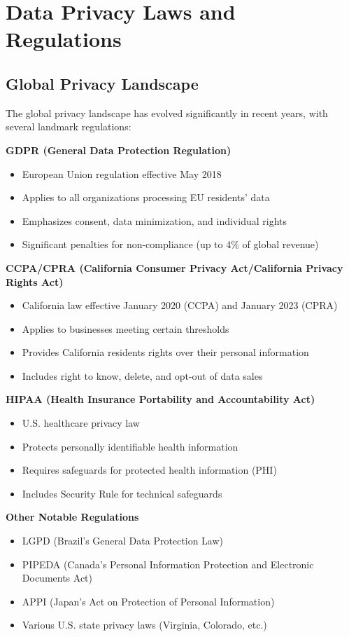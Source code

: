 \documentclass[12pt]{article}
\begin{document}
\section{Data Privacy Laws and Regulations}

\subsection{Global Privacy Landscape}
\begin{tcolorbox}[colback=gray!10!white,colframe=gray!50!black,title={Major Privacy Regulations}]
The global privacy landscape has evolved significantly in recent years, with several landmark regulations:

\textbf{GDPR (General Data Protection Regulation)}
\begin{itemize}
    \item European Union regulation effective May 2018
    \item Applies to all organizations processing EU residents' data
    \item Emphasizes consent, data minimization, and individual rights
    \item Significant penalties for non-compliance (up to 4\% of global revenue)
\end{itemize}

\textbf{CCPA/CPRA (California Consumer Privacy Act/California Privacy Rights Act)}
\begin{itemize}
    \item California law effective January 2020 (CCPA) and January 2023 (CPRA)
    \item Applies to businesses meeting certain thresholds
    \item Provides California residents rights over their personal information
    \item Includes right to know, delete, and opt-out of data sales
\end{itemize}

\textbf{HIPAA (Health Insurance Portability and Accountability Act)}
\begin{itemize}
    \item U.S. healthcare privacy law
    \item Protects personally identifiable health information
    \item Requires safeguards for protected health information (PHI)
    \item Includes Security Rule for technical safeguards
\end{itemize}

\textbf{Other Notable Regulations}
\begin{itemize}
    \item LGPD (Brazil's General Data Protection Law)
    \item PIPEDA (Canada's Personal Information Protection and Electronic Documents Act)
    \item APPI (Japan's Act on Protection of Personal Information)
    \item Various U.S. state privacy laws (Virginia, Colorado, etc.)
\end{itemize}
\end{tcolorbox}
\end{document}
